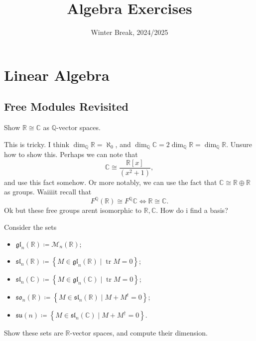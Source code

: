 \documentclass[11pt]{report}
\title{Algebra Exercises}
\date{Winter Break, 2024/2025}
\DeclareMathOperator{\Tr}{tr}
\begin{document}
\makereport
{}
\chapter{Linear Algebra}
\section{Free Modules Revisited}
\begin{exercise}
	Show $\mathbb{R} \cong \mathbb{C} $ as $\mathbb{Q} $-vector spaces.
\end{exercise}
\begin{solution}
	This is tricky. I think $\dim_{\mathbb{Q} } \mathbb{R} =\aleph_0$, and $\dim_{\mathbb{Q} } \mathbb{C} =2 \dim _{\mathbb{Q} } \mathbb{R} =\dim_{\mathbb{Q} } \mathbb{R} $. Unsure how to show this. Perhaps we can note that
	\[
		\mathbb{C} \cong \frac{\mathbb{R} [x]}{\left( x^2+1 \right) } 
	,\]
	and use this fact somehow. Or more notably, we can use the fact that $\mathbb{C} \cong \mathbb{R} \oplus \mathbb{R} $ as groups. Waiiiit recall that
	\[
		F^{\mathbb{Q} } (\mathbb{R} )\cong F^{\mathbb{Q} } \mathbb{C} \iff \mathbb{R} \cong \mathbb{C} 
	.\]
	Ok but these free groups arent isomorphic to $\mathbb{R} ,\mathbb{C} $. How do i find a basis?
\end{solution}
\begin{exercise}
	Consider the sets
	\begin{itemize}
		\item $\mathfrak{gl}_n(\mathbb{R} )\coloneqq \mathcal{M}_n(\mathbb{R} )$;
	\item $\mathfrak{sl}_n(\mathbb{R} )\coloneqq \left\{ M\in \mathfrak{gl}_n(\mathbb{R} )\mid \Tr M=0 \right\} $;
	\item $\mathfrak{sl}_n(\mathbb{C} )\coloneqq \left\{ M\in \mathfrak{gl}_n(\mathbb{C} )\mid \Tr M=0 \right\} $;
	\item $\mathfrak{so}_n(\mathbb{R} )\coloneqq \left\{ M\in \mathfrak{sl}_n(\mathbb{R} )\mid M+M^t=0 \right\} $;
	\item $\mathfrak{su}(n)\coloneqq \left\{ M\in \mathfrak{sl}_n(\mathbb{C} )\mid M+M^\dagger=0 \right\} $.
	\end{itemize}
	Show these sets are $\mathbb{R} $-vector spaces, and compute their dimension.
\end{exercise}
\end{document}
